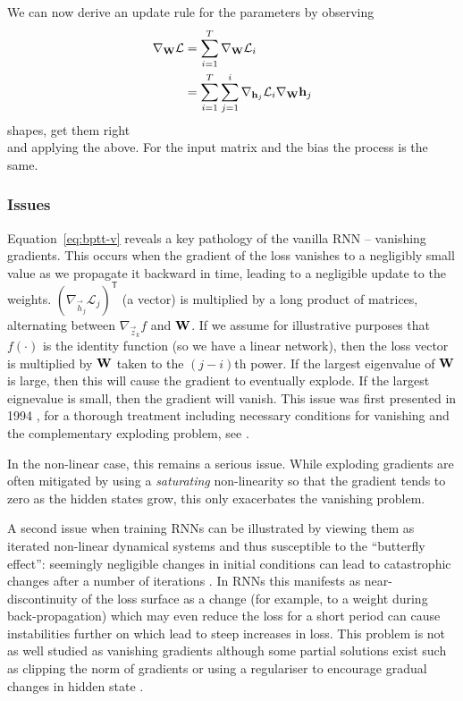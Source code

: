 We can now derive an update rule for the parameters by observing
\begin{align}
	\nabla_{\mathbf{W}} \mathcal{L} &= \sum_{i=1}^T \nabla_{\mathbf{W}} \mathcal{L}_i \\
	&= \sum_{i=1}^T\sum_{j=1}^i\nabla_{\mathbf{h}_j} \mathcal{L}_i \nabla_{\mathbf{W}} \mathbf{h}_j
\end{align} 
{\Large shapes, get them right}\\
and applying the above. For the input matrix and the bias the process is the same.

\subsubsection{Issues}
Equation~\eqref{eq:bptt-v} reveals a key pathology of the vanilla RNN -- vanishing gradients.
This occurs when the gradient of the loss vanishes to a negligibly small value as we
propagate it backward in time, leading to a negligible update to the weights.
 \((\nabla_{\vec{h}_j}\mathcal{L}_j)^\mathsf{T}\) (a vector) is multiplied by a long product of
 matrices, alternating between \(\nabla_{\vec{z}_k} f\) and \(\mathbf{W}\). If we assume for
 illustrative purposes that \(f(\cdot)\) is the identity function (so we have a linear network),
then the loss vector is multiplied by \(\mathbf{W}\) taken to the \((j-i)\)th power. If the largest
eigenvalue of \(\mathbf{W}\) is large, then this will cause the gradient to eventually explode.
If the largest eignevalue is small, then the gradient will vanish. This issue was first presented
in 1994 \autocite{Bengio1994}, for a thorough treatment including necessary conditions 
for vanishing and the complementary exploding problem, see \autocite{Pascanu2012}.

In the non-linear case, this remains a serious issue. While exploding gradients are often
mitigated by using a \emph{saturating} non-linearity so that the gradient tends to zero as the
hidden states grow, this only exacerbates the vanishing problem. 

A second issue when training RNNs can be illustrated by viewing them as iterated non-linear	
dynamical systems and thus susceptible to the ``butterfly effect'': seemingly negligible changes
in initial conditions can lead to catastrophic changes after a number of iterations
\autocite{Lorenz1963}. In RNNs this manifests as near-discontinuity of the loss surface
\autocite{Pascanu2012} as a change (for example, to a weight during back-propagation) which may
even reduce the loss for a short period can cause instabilities further on which lead to steep
increases in loss. This problem is not as well studied as vanishing gradients although some
partial solutions exist such as clipping the norm of gradients \autocite{Pascanu2012} or
using a regulariser to encourage gradual changes in hidden state \autocite{Krueger2016}.

